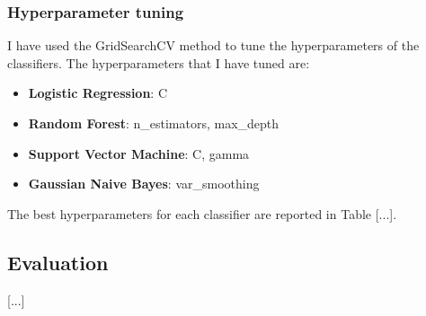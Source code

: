 \subsubsection{Hyperparameter tuning}
\label{sec:training-hyperparameter-tuning}
I have used the GridSearchCV method to tune the hyperparameters of the classifiers.
The hyperparameters that I have tuned are:
\begin{itemize}
    \item \textbf{Logistic Regression}: C
    \item \textbf{Random Forest}: n\_estimators, max\_depth
    \item \textbf{Support Vector Machine}: C, gamma
    \item \textbf{Gaussian Naive Bayes}: var\_smoothing
\end{itemize}
The best hyperparameters for each classifier are reported in Table [...].

\subsection{Evaluation}
\label{sec:evaluation}
[...]

